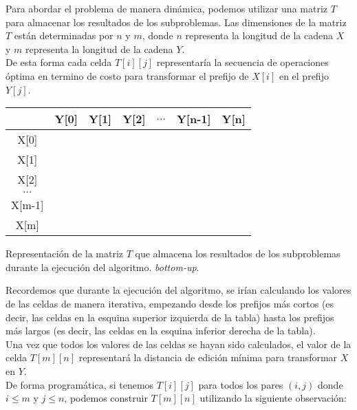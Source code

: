 Para abordar el problema de manera dinámica, podemos utilizar una matriz \(T\) para almacenar los resultados de los subproblemas. Las dimensiones de la matriz \(T\) están determinadas por \(n\) y \(m\), donde \(n\) representa la longitud de la cadena \(X\) y \(m\) representa la longitud de la cadena \(Y\). \\

De esta forma cada celda \(T[i][j]\) representaría la secuencia de operaciones óptima en termino de costo para transformar el prefijo de \(X[i]\) en el prefijo \(Y[j]\).\\ 

\begin{center}
\begin{tabular}{ c |c |c |c |c |c |c }
     & Y[0] & Y[1] & Y[2] & \(\dots\) & Y[n-1] & Y[n]\\ 
     \hline
    X[0] & & & & & & \\ 
    \hline
    X[1] & & & & & & \\ 
    \hline
    X[2] & & & & & & \\ 
    \hline
    \(\dots\) & & & & & & \\ 
    \hline
    X[m-1] & & & & & & \\ 
    \hline
    X[m] & & & & & & \\ 
\end{tabular}
\end{center}

\begin{center}
\small\textcolor{FSBlue}{Representación de la matriz \(T\) que almacena los resultados de los subproblemas durante la ejecución del algoritmo. \textit{bottom-up}.}
\end{center}

Recordemos que durante la ejecución del algoritmo, se irían calculando los valores de las celdas de manera iterativa, empezando desde los prefijos más cortos (es decir, las celdas en la esquina superior izquierda de la tabla) hasta los prefijos más largos (es decir, las celdas en la esquina inferior derecha de la tabla).\\

Una vez que todos los valores de las celdas se hayan sido calculados, el valor de la celda \(T[m][n]\) representará la distancia de edición mínima para transformar \(X\) en \(Y\).\\

De forma programática, si tenemos \(T[i][j]\) para todos los pares \((i, j)\) donde \(i \leq m\) y \(j \leq n\), podemos construir \(T[m][n]\) utilizando la siguiente observación:

